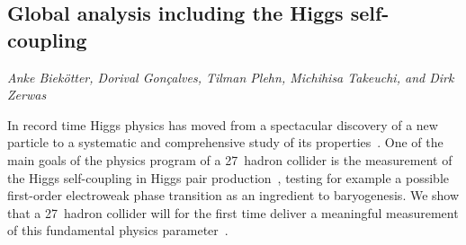
\subsection{Global analysis including the Higgs self-coupling}
\label{sec8:cubicetc}
\begin{center}
\textit{Anke Biek\"otter, Dorival Gon\c{c}alves, Tilman Plehn, Michihisa Takeuchi, and Dirk Zerwas}
\end{center}



In record time Higgs physics has moved from a spectacular discovery of
a new particle to a systematic and comprehensive study of its
properties~\cite{Dawson:2018dcd}. 
One of the main goals of the physics program of a 27~\UTeV hadron 
collider 
is the measurement of the Higgs self-coupling in Higgs pair
production~\cite{Baur:2003gp,Kling:2016lay,Goncalves:2018yva,Homiller:2018dgu,Barger:2013jfa,Barr:2014sga},
testing for example a possible first-order electroweak
phase transition as an ingredient to
baryogenesis. 
We show that a 27~\UTeV hadron collider will for the first time 
deliver a meaningful measurement of this fundamental physics 
parameter~\cite{Biekotter:2018jzu}. \medskip


